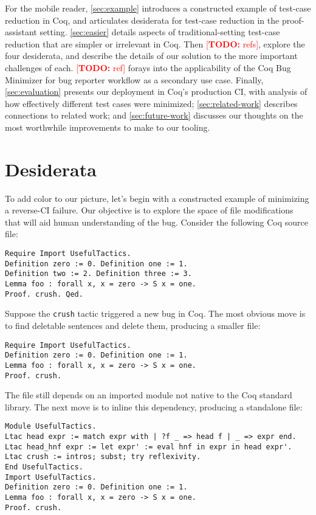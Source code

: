 \documentclass[a4paper,USenglish,cleveref,autoref,thm-restate]{lipics-v2021}
\makeatletter
\newcommand{\todo}[1]{%
\@latex@warning{TODO: \detokenize{#1} on page \thepage}%
\textcolor{red}{[\textbf{TODO:} #1]}}%
\makeatother
\begin{document}
For the mobile reader, \autoref{sec:example} introduces a constructed example of test-case reduction in Coq, and articulates desiderata for test-case reduction in the proof-assistant setting.
 \autoref{sec:easier} details aspects of traditional-setting test-case reduction that are simpler or irrelevant in Coq.
Then \todo{refs}, explore the four desiderata, and describe the details of our solution to the more important challenges of each.
 \todo{ref} forays into the applicability of the Coq Bug Minimizer for bug reporter workflow as a secondary use case.
Finally, \autoref{sec:evaluation} presents our deployment in Coq's production CI, with analysis of how effectively different test cases were minimized; \autoref{sec:related-work} describes connections to related work; and \autoref{sec:future-work} discusses our thoughts on the most worthwhile improvements to make to our tooling.



\section{Desiderata}\label{sec:example}


To add color to our picture, let's begin with a constructed example of minimizing a reverse-CI failure.
Our objective is to explore the space of file modifications that will aid human understanding of the bug.
Consider the following Coq source file:
\begin{verbatim}
Require Import UsefulTactics.
Definition zero := 0. Definition one := 1.
Definition two := 2. Definition three := 3.
Lemma foo : forall x, x = zero -> S x = one.
Proof. crush. Qed.
\end{verbatim}

Suppose the \texttt{crush} tactic triggered a new bug in Coq.
The most obvious move is to find deletable sentences and delete them, producing a smaller file:
\begin{verbatim}
Require Import UsefulTactics.
Definition zero := 0. Definition one := 1.
Lemma foo : forall x, x = zero -> S x = one.
Proof. crush.
\end{verbatim}

The file still depends on an imported module not native to the Coq standard library.
The next move is to inline this dependency, producing a standalone file:
\begin{verbatim}
Module UsefulTactics.
Ltac head expr := match expr with | ?f _ => head f | _ => expr end.
Ltac head_hnf expr := let expr' := eval hnf in expr in head expr'.
Ltac crush := intros; subst; try reflexivity.
End UsefulTactics.
Import UsefulTactics.
Definition zero := 0. Definition one := 1.
Lemma foo : forall x, x = zero -> S x = one.
Proof. crush.
\end{verbatim}
\end{document}
